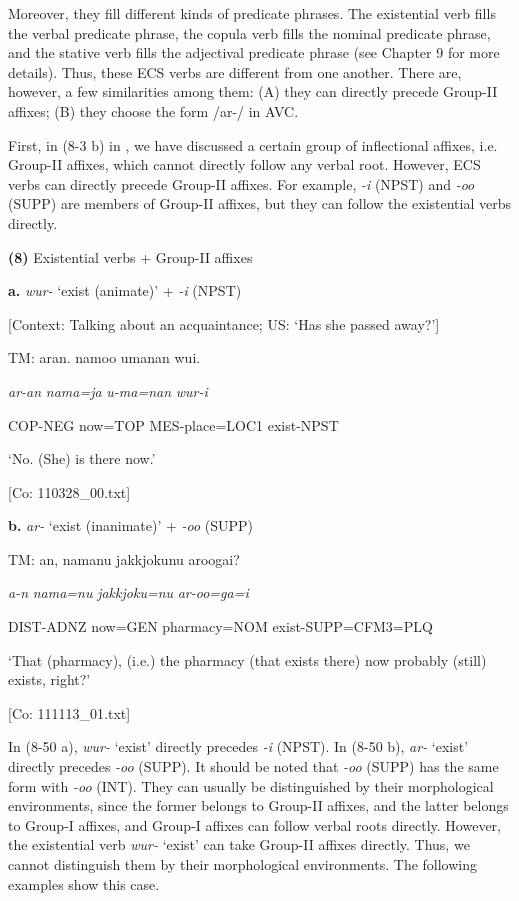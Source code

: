 Moreover, they fill different kinds of predicate phrases. The existential verb fills the verbal predicate phrase, the copula verb fills the nominal predicate phrase, and the stative verb fills the adjectival predicate phrase (see Chapter 9 for more details). Thus, these ECS verbs are different from one another. There are, however, a few similarities among them: (A) they can directly precede Group-II affixes; (B) they choose the form /ar-/ in AVC.

  First, in (8-3 b) in , we have discussed a certain group of inflectional affixes, i.e. Group-II affixes, which cannot directly follow any verbal root. However, ECS verbs can directly precede Group-II affixes. For example, \textit{{}-i} (NPST) and \textit{{}-oo} (SUPP) are members of Group-II affixes, but they can follow the existential verbs directly.

\textbf{(8)}  Existential verbs + Group-II affixes

  \textbf{a.}  \textit{wur-} ‘exist (animate)’ + \textit{-i} (NPST)

    [Context: Talking about an acquaintance; US: ‘Has she passed away?’]

    TM:  aran.  namoo  umanan  wui.

      \textit{ar-an}  \textit{nama=ja}  \textit{u-ma=nan}  \textit{wur-i}

      COP-NEG  now=TOP  MES-place=LOC1  exist-NPST

      ‘No. (She) is there now.’

      [Co: 110328\_00.txt]

  \textbf{b.}  \textit{ar-} ‘exist (inanimate)’ + \textit{-oo} (SUPP)

    TM:  an,  namanu  {\textbar}jakkjoku{\textbar}nu  aroogai?

      \textit{a-n}  \textit{nama=nu}  \textit{jakkjoku=nu}  \textit{ar-oo=ga=i}

      DIST-ADNZ  now=GEN  pharmacy=NOM  exist-SUPP=CFM3=PLQ

      ‘That (pharmacy), (i.e.) the pharmacy (that exists there) now probably (still) exists, right?’

      [Co: 111113\_01.txt]

In (8-50 a), \textit{wur-} ‘exist’ directly precedes \textit{{}-i} (NPST). In (8-50 b), \textit{ar-} ‘exist’ directly precedes \textit{{}-oo} (SUPP). It should be noted that \textit{{}-oo} (SUPP) has the same form with \textit{{}-oo} (INT). They can usually be distinguished by their morphological environments, since the former belongs to Group-II affixes, and the latter belongs to Group-I affixes, and Group-I affixes can follow verbal roots directly. However, the existential verb \textit{wur-} ‘exist’ can take Group-II affixes directly. Thus, we cannot distinguish them by their morphological environments. The following examples show this case.

